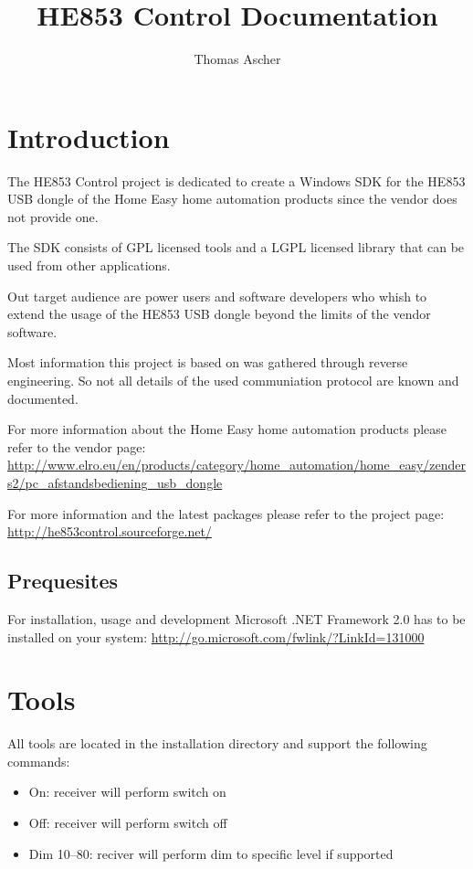 \documentclass[
a4paper,
oneside,
halfparskip*,
normalheadings,
]
{scrbook}
\begin{document}
\title{HE853 Control Documentation}
\author{Thomas Ascher}
\maketitle
\tableofcontents
\mainmatter

\chapter{Introduction}

The HE853 Control project is dedicated to create a Windows SDK for the HE853 USB
dongle of the Home Easy home automation products since the vendor does not provide
one.

The SDK consists of GPL licensed tools and a LGPL licensed library that can be
used from other applications.

Out target audience are power users and software developers who whish to extend the
usage of the HE853 USB dongle beyond the limits of the vendor software.

Most information this project is based on was gathered through reverse engineering.
So not all details of the used communiation protocol are known and documented.

For more information about the Home Easy home automation products please refer to
the vendor page: \url{http://www.elro.eu/en/products/category/home_automation/home_easy/zenders2/pc_afstandsbediening_usb_dongle}

For more information and the latest packages please refer to the project page:
\url{http://he853control.sourceforge.net/}

\section{Prequesites}
For installation, usage and development Microsoft .NET Framework 2.0 has to be installed on
your system: \url{http://go.microsoft.com/fwlink/?LinkId=131000}




\chapter{Tools}

All tools are located in the installation directory and support the following commands:

\begin{itemize}
	\item On: receiver will perform switch on
	\item Off: receiver will perform switch off
	\item Dim 10--80: reciver will perform dim to specific level if supported
\end{itemize}
\end{document}
